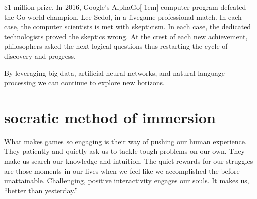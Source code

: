 \$1 million prize. In 2016, Google's
AlphaGo\normalmarginpar{}[-1em] computer program defeated the Go world champion, Lee Sedol, in a
five\textendash game professional match.
\label{link:watson}In each case, the computer scientists is met with skepticism. In each case, the
dedicated technologists proved the skeptics wrong. At the crest of each new
achievement, philosophers asked the next logical questions thus restarting the cycle of discovery and progress.

By leveraging big data, artificial neural networks, and natural language
processing we can continue to explore new horizons.


\section{socratic method of immersion}
What makes games so engaging is their way of pushing our human experience.
\label{img:spock}
They patiently and quietly ask us to tackle tough problems on our own. They make
us search our knowledge and intuition. The quiet rewards for our struggles are
those moments in our lives when we feel like we accomplished the before
unattainable. Challenging, positive interactivity engages our souls. It makes us, ``better than yesterday.''

